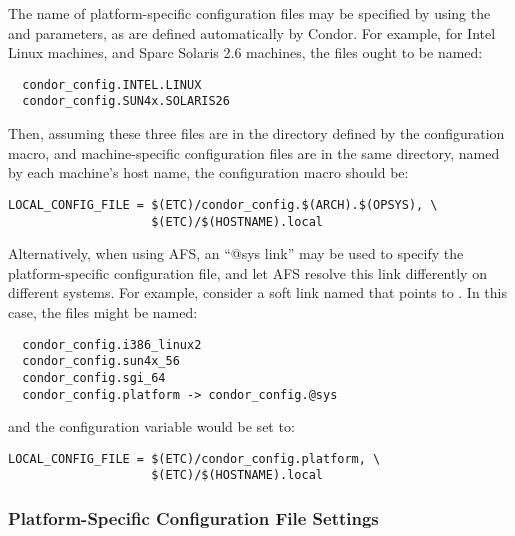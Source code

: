 The name of 
platform-specific configuration files may be specified by using the
 and  parameters, as are defined
automatically by Condor.
For example, for Intel Linux
machines, and Sparc Solaris 2.6 machines,
the files ought to be named:

\begin{verbatim}
  condor_config.INTEL.LINUX
  condor_config.SUN4x.SOLARIS26
\end{verbatim}

Then, assuming these three files are in the directory defined by the
 configuration macro,
and machine-specific configuration files are in
the same directory, named by each machine's host name, the
 configuration macro should be:

\footnotesize
\begin{verbatim}
LOCAL_CONFIG_FILE = $(ETC)/condor_config.$(ARCH).$(OPSYS), \
                    $(ETC)/$(HOSTNAME).local
\end{verbatim}
\normalsize

Alternatively, when using AFS, an ``@sys link'' may be used to
specify the platform-specific configuration file,
and let AFS resolve this link differently on different systems.
For example, consider
a soft link named  that points to
.  In this case, the files might be named:

\begin{verbatim}
  condor_config.i386_linux2
  condor_config.sun4x_56
  condor_config.sgi_64
  condor_config.platform -> condor_config.@sys
\end{verbatim}

and the  configuration variable would be set to:

\footnotesize
\begin{verbatim}
LOCAL_CONFIG_FILE = $(ETC)/condor_config.platform, \
                    $(ETC)/$(HOSTNAME).local
\end{verbatim}
\normalsize

\subsubsection{\label{sec:Platform-Specific-Settings}Platform-Specific
Configuration File Settings}

